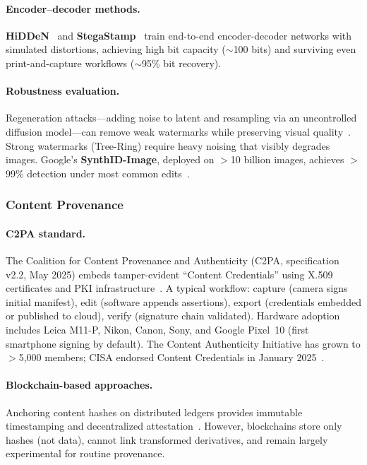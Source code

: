 \paragraph{Encoder--decoder methods.}
\textbf{HiDDeN}~\cite{zhu2018hidden} and \textbf{StegaStamp}~\cite{tancik2020stegastamp} train end-to-end encoder-decoder networks with simulated distortions, achieving high bit capacity ($\sim$100 bits) and surviving even print-and-capture workflows ($\sim$95\% bit recovery).

\paragraph{Robustness evaluation.}
Regeneration attacks---adding noise to latent and resampling via an uncontrolled diffusion model---can remove weak watermarks while preserving visual quality~\cite{zhao2023regeneration}. Strong watermarks (Tree-Ring) require heavy noising that visibly degrades images. Google's \textbf{SynthID-Image}, deployed on $>$10 billion images, achieves $>$99\% detection under most common edits~\cite{gowal2024synthidimage}.


\subsubsection{Content Provenance}
\label{sec:provenance}

\paragraph{C2PA standard.}
The Coalition for Content Provenance and Authenticity (C2PA, specification v2.2, May 2025) embeds tamper-evident ``Content Credentials'' using X.509 certificates and PKI infrastructure~\cite{c2pa2025}. A typical workflow: capture (camera signs initial manifest), edit (software appends assertions), export (credentials embedded or published to cloud), verify (signature chain validated). Hardware adoption includes Leica M11-P, Nikon, Canon, Sony, and Google Pixel~10 (first smartphone signing by default). The Content Authenticity Initiative has grown to $>$5,000 members; CISA endorsed Content Credentials in January 2025~\cite{cisa2025cc}.

\paragraph{Blockchain-based approaches.}
Anchoring content hashes on distributed ledgers provides immutable timestamping and decentralized attestation~\cite{incyan2024blockchain}. However, blockchains store only hashes (not data), cannot link transformed derivatives, and remain largely experimental for routine provenance.

